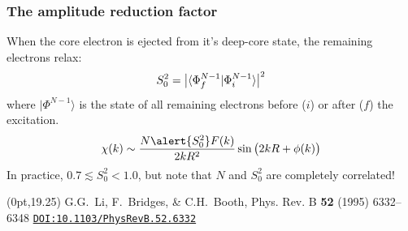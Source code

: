 \documentclass[10pt, xcolor=x11names, compress]{beamer}
\begin{document}
\begin{frame}
  \frametitle{The amplitude reduction factor}

  When the core electron is ejected from it's deep-core state, the
  remaining electrons relax:
  \begin{equation}
    S_0^2 = \big|\langle \Phi_f^{N-1}  | \Phi_i^{N-1}  \rangle
    \big|^2    \notag
  \end{equation}
  where $|\Phi^{N-1}\rangle$ is the state of all remaining electrons
  before ($i$) or after ($f$) the excitation.
  \begin{equation}
    \chi(k) \sim \frac{N\alert{S_0^2}F(k)}{2kR^2}\sin\big(2kR+\phi(k)\big)
    \notag
  \end{equation}
  In practice, $0.7\lesssim S_0^2<1.0$, but note that $N$ and $S_0^2$
  are completely correlated!
  \begin{textblock*}{0.6\linewidth}(0pt,19.25\TPVertModule)%
    \tiny%
    G.G.\ Li, F.\ Bridges, \& C.H.\ Booth, Phys. Rev. B \textbf{52}
    (1995) 6332--6348
    \href{http://dx.doi.org/10.1103/PhysRevB.52.6332}
    {\color{Blue4}\texttt{DOI:10.1103/PhysRevB.52.6332}}
  \end{textblock*}
\end{frame}
\end{document}
